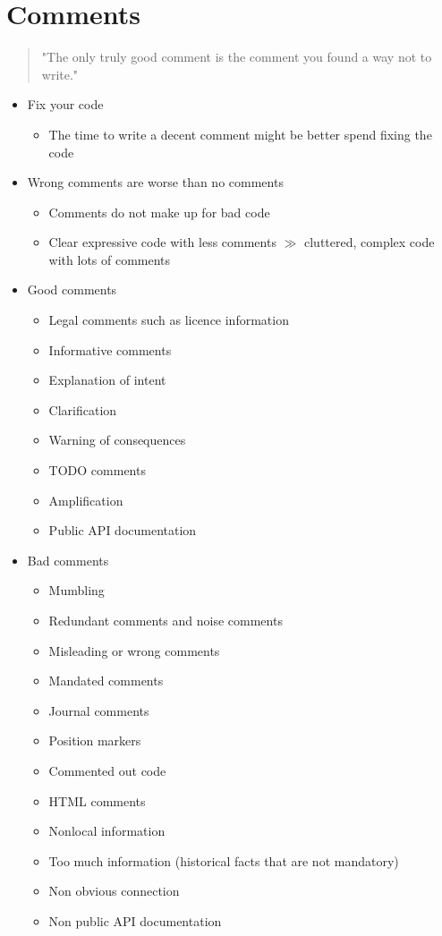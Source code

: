 
\section{Comments}
\begin{quote}
    "The only truly good comment is the comment you found a way not to write."
\end{quote}
\begin{itemize}
    \item Fix your code
    \begin{itemize}
        \item The time to write a decent comment might be better spend fixing the code
    \end{itemize}
    \item Wrong comments are worse than no comments
    \begin{itemize}
        \item Comments do not make up for bad code
        \item Clear expressive code with less comments $\gg$ cluttered, complex code with lots of comments
    \end{itemize}
    \item Good comments
    \begin{itemize}
        \item Legal comments such as licence information
        \item Informative comments
        \item Explanation of intent
        \item Clarification
        \item Warning of consequences
        \item TODO comments
        \item Amplification
        \item Public API documentation
    \end{itemize}
    \item Bad comments
    \begin{itemize}
        \item Mumbling
        \item Redundant comments and noise comments
        \item Misleading or wrong comments
        \item Mandated comments
        \item Journal comments
        \item Position markers
        \item Commented out code
        \item HTML comments
        \item Nonlocal information
        \item Too much information (historical facts that are not mandatory)
        \item Non obvious connection
        \item Non public API documentation
    \end{itemize}
\end{itemize}